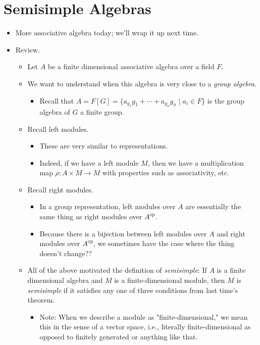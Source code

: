 \documentclass[../notes.tex]{subfiles}
\begin{document}
\section{Semisimple Algebras}
\begin{itemize}
    \item {}More associative algebra today; we'll wrap it up next time.
    \item Review.
    \begin{itemize}
        \item Let $A$ be a finite dimensional associative algebra over a field $F$.
        \item We want to understand when this algebra is very close to a \emph{group algebra}.
        \begin{itemize}
            \item Recall that $A=F[G]=\{a_{g_1}g_1+\cdots+a_{g_n}g_n\mid a_i\in F\}$ is the group algebra of $G$ a finite group.
        \end{itemize}
        \item Recall left modules.
        \begin{itemize}
            \item These are very similar to representations.
            \item Indeed, if we have a left module $M$, then we have a multiplication map $\rho:A\times M\to M$ with properties such as associativity, etc.
        \end{itemize}
        \item Recall right modules.
        \begin{itemize}
            \item In a group representation, left modules over $A$ are essentially the same thing as right modules over $A^\text{op}$.
            \item Because there is a bijection between left modules over $A$ and right modules over $A^\text{op}$, we sometimes have the case where the thing doesn't change??
        \end{itemize}
        \item All of the above motivated the definition of \emph{semisimple}: If $A$ is a finite dimensional algebra and $M$ is a finite-dimensional module, then $M$ is \emph{semisimple} if it satisfies any one of three conditions from last time's theorem.
        \begin{itemize}
            \item Note: When we describe a module as "finite-dimensional," we mean this in the sense of a vector space, i.e., literally finite-dimensional as opposed to finitely generated or anything like that.

\end{itemize}
\end{itemize}
\end{itemize}
\end{document}
